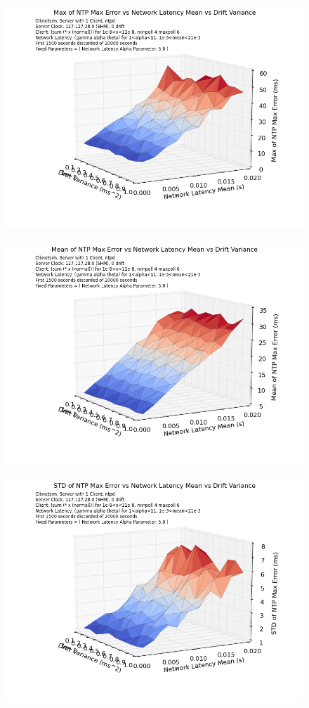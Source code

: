 \begin{figure}[h]
  \caption{}
  \label{fig:max-mean-var-drift}
  \includegraphics[width=0.8\linewidth]{max_max_err-mean_latency-drift_variance.png}
\end{figure}

\begin{figure}[h]
  \caption{}
  \label{fig:mean-mean-var-drift}
  \includegraphics[width=0.8\linewidth]{mean_max_err-mean_latency-drift_variance.png}
\end{figure}

\begin{figure}[h]
  \caption{}
  \label{fig:stddev-mean-drift-var}
  \includegraphics[width=0.8\linewidth]{stddev_max_err-mean_latency-drift_variance}
\end{figure}

